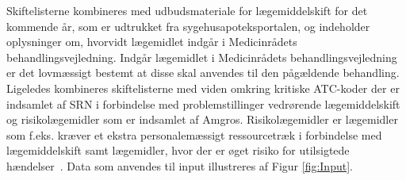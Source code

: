 Skiftelisterne kombineres med udbudsmateriale for lægemiddelskift for det kommende år, som er udtrukket fra sygehusapoteksportalen, og indeholder oplysninger om, hvorvidt lægemidlet indgår i Medicinrådets behandlingsvejledning. Indgår lægemidlet i Medicinrådets behandlingsvejledning er det lovmæssigt bestemt at disse skal anvendes til den pågældende behandling. Ligeledes kombineres skiftelisterne med viden omkring kritiske ATC-koder der er indsamlet af SRN i forbindelse med problemstillinger vedrørende lægemiddelskift og risikolægemidler som er indsamlet af Amgros. Risikolægemidler er lægemidler som f.eks. kræver et ekstra personalemæssigt ressourcetræk i forbindelse med lægemiddelskift samt lægemidler, hvor der er øget risiko for utilsigtede hændelser~\citep{Amgros}. Data som anvendes til input illustreres af Figur \ref{fig:Input}.









